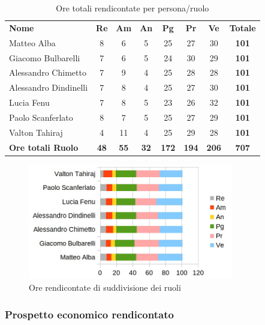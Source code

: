 		\begin{table} [h!]
			\begin{center}
				\begin{tabular} { m{3.5cm} c c c c c c c }
					\rowcolor{lightgray}
					\textbf{Nome} & \textbf{Re} & \textbf{Am} & \textbf{An} & \textbf{Pg} & \textbf{Pr} & \textbf{Ve} & \textbf{Totale} \\
					Matteo Alba & 8 & 6 & 5 & 25 & 27 & 30 & \textbf{101} \\
					Giacomo Bulbarelli & 7 & 6 & 5 & 24 & 30 & 29 & \textbf{101} \\
					Alessandro Chimetto & 7 & 9 & 4 & 25 & 28 & 28 & \textbf{101} \\
					Alessandro Dindinelli & 7 & 8 & 4 & 25 & 27 & 30 & \textbf{101} \\
					Lucia Fenu & 7 & 8 & 5 & 23 & 26 & 32 & \textbf{101} \\
					Paolo Scanferlato & 8 & 7 & 5 & 25 & 27 & 29 & \textbf{101} \\
					Valton Tahiraj & 4 & 11 & 4 & 25 & 29 & 28 & \textbf{101} \\
					\textbf{Ore totali Ruolo} & \textbf{48} & \textbf{55} & \textbf{32} & \textbf{172} & \textbf{194}& \textbf{206} & \textbf{707}
				\end{tabular}
				\caption{Ore totali rendicontate per persona/ruolo}
			\end{center}
		\end{table}
	
		\begin{figure} [h!]
			\centering
			\includegraphics[width=0.8\textwidth]{res/img/grafici/ore_rendicontate.jpg}
			\caption{Ore rendicontate di suddivisione dei ruoli} 
		\end{figure}
	
	\newpage
	
	\subsubsection{Prospetto economico rendicontato}
	
